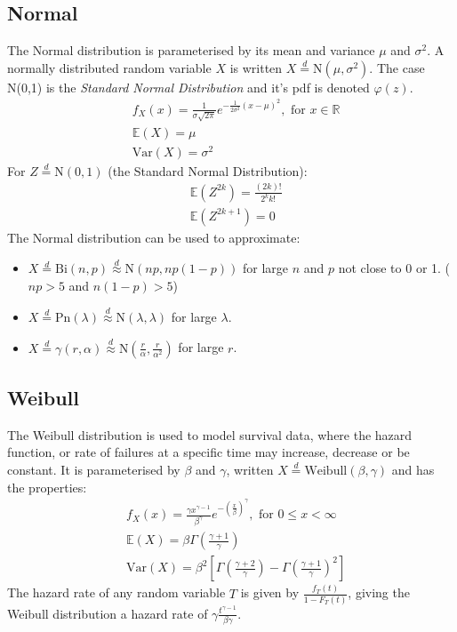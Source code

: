 \documentclass[titlepage,twocolumn]{article}
\begin{document}
\subsection*{Normal}
The Normal distribution is parameterised by its mean and variance $\mu$ and $\sigma^2$. A normally distributed random variable $X$ is written $X\stackrel{d}{=}\mbox{N}(\mu, \sigma^2)$. The case N(0,1) is the \textit{Standard Normal Distribution} and it's pdf is denoted $\varphi(z)$.
\begin{align*}
    &f_X(x)=\frac{1}{\sigma \sqrt{2\pi}}e^{-\frac{1}{2\sigma^2}(x-\mu)^2}, \mbox{ for } x \in \mathbb{R}\\
    &\mathbb{E}(X)=\mu\\
    &\mbox{Var}(X)=\sigma^2
\end{align*}
For $Z \stackrel{d}{=}\mbox{N}(0,1)$ (the Standard Normal Distribution):
\begin{align*}
    &\mathbb{E}(Z^{2k})=\frac{(2k)!}{2^k k!}\\
    &\mathbb{E}(Z^{2k+1})=0
\end{align*}
The Normal distribution can be used to approximate:
\begin{itemize}
    \item $X \stackrel{d}{=}\mbox{Bi}(n,p) \stackrel{d}{\approx}\mbox{N}(np,np(1-p))$ for large $n$ and $p$ not close to 0 or 1. ($np > 5$ and $n(1-p) > 5$)
    \item $X \stackrel{d}{=}\mbox{Pn}(\lambda) \stackrel{d}{\approx}\mbox{N}(\lambda, \lambda)$ for large $\lambda$.
    \item $X \stackrel{d}{=} \gamma(r,\alpha) \stackrel{d}{\approx}\mbox{N}(\frac{r}{\alpha}, \frac{r}{\alpha^2})$ for large $r$.
\end{itemize}

\subsection*{Weibull}
The Weibull distribution is used to model survival data, where the hazard function, or rate of failures at a specific time may increase, decrease or be constant. It is parameterised by $\beta$ and $\gamma$, written $X\stackrel{d}{=}\mbox{Weibull}(\beta, \gamma)$ and has the properties:
\begin{align*}
    &f_X(x)=\frac{\gamma x^{\gamma - 1}}{\beta^\gamma}e^{-(\frac{x}{\beta})^\gamma}, \mbox{ for } 0 \leq x < \infty\\
    &\mathbb{E}(X)=\beta \Gamma\left(\frac{\gamma + 1}{\gamma}\right)\\
    &\mbox{Var}(X)=\beta^2 \left[\Gamma\left(\frac{\gamma + 2}{\gamma}\right)-\Gamma\left(\frac{\gamma + 1}{\gamma}\right)^2\right]
\end{align*}
The hazard rate of any random variable $T$ is given by $\frac{f_T(t)}{1-F_T(t)}$, giving the Weibull distribution a hazard rate of $\gamma \frac{t^{\gamma-1}}{\beta \gamma}$.
\end{document}
